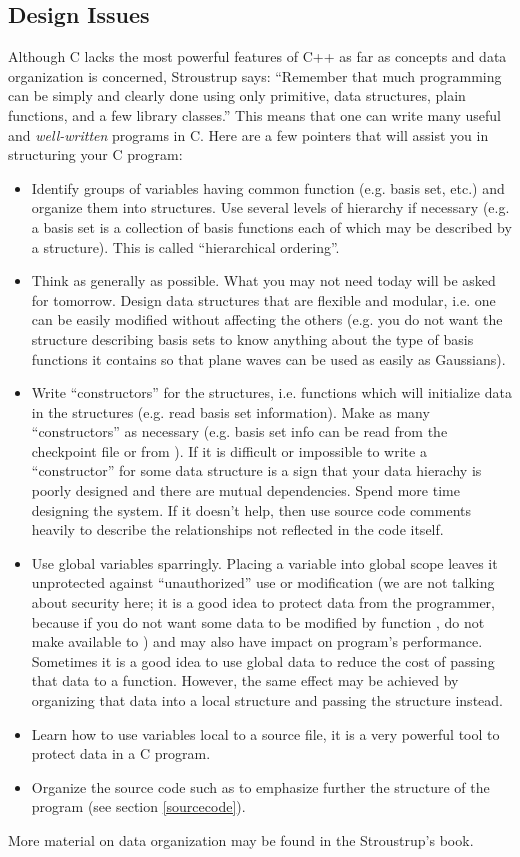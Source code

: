 \subsection{Design Issues}
Although C lacks the most powerful features of C++ as far as concepts
and data organization is concerned, Stroustrup says: ``Remember that
much programming can be simply and clearly done using only primitive,
data structures, plain functions, and a few library classes.''  This
means that one can write many useful and {\em well-written} programs
in C.  Here are a few pointers that will assist you in structuring
your C program:
\begin{itemize}
\item Identify groups of variables having common function (e.g. basis
set, etc.)  and organize them into structures. Use several levels of
hierarchy if necessary (e.g.  a basis set is a collection of basis
functions each of which may be described by a structure). This is
called ``hierarchical ordering''.
\item Think as generally as possible. What you may not need today will
be asked for tomorrow. Design data structures that are flexible and
modular, i.e. one can be easily modified without affecting the others
(e.g. you do not want the structure describing basis sets to know
anything about the type of basis functions it contains so that plane
waves can be used as easily as Gaussians).
\item Write ``constructors'' for the structures, i.e. functions which
will initialize data in the structures (e.g. read basis set
information). Make as many ``constructors'' as necessary (e.g. basis
set info can be read from the checkpoint file or from \pbasisdat). If
it is difficult or impossible to write a ``constructor'' for some data
structure is a sign that your data hierachy is poorly designed and
there are mutual dependencies. Spend more time designing the
system. If it doesn't help, then use source code comments heavily to
describe the relationships not reflected in the code itself.
\item Use global variables sparringly. Placing a variable into global
scope leaves it unprotected against ``unauthorized'' use or
modification (we are not talking about security here; it is a good
idea to protect data from the programmer, because if you do not want
some data  to be modified by function , do not make
 available to ) and may also have impact on
program's performance. Sometimes it is a good idea to use global data
to reduce the cost of passing that data to a function. However, the
same effect may be achieved by organizing that data into a local
structure and passing the structure instead.
\item Learn how to use  variables local to a source
file, it is a very powerful tool to protect data in a C program.
\item Organize the source code such as to emphasize further the
structure of the program (see section \ref{sourcecode}).
\end{itemize}
More material on data organization may be found in the Stroustrup's
book.

